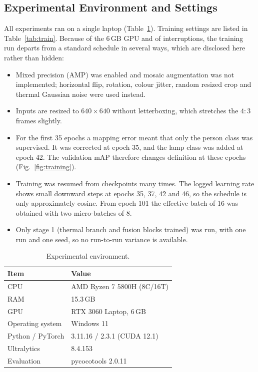 \documentclass[journal]{IEEEtran}
\begin{document}
\subsection{Experimental Environment and Settings}
All experiments ran on a single laptop (Table~\ref{tab:env}). Training settings are listed in Table~\ref{tab:train}. Because of the 6\,GB GPU and of interruptions, the training run departs from a standard schedule in several ways, which are disclosed here rather than hidden:
\begin{itemize}
\item Mixed precision (AMP) was enabled and mosaic augmentation was not implemented; horizontal flip, rotation, colour jitter, random resized crop and thermal Gaussian noise were used instead.
\item Inputs are resized to $640\times640$ without letterboxing, which stretches the $4{:}3$ frames slightly.
\item For the first 35 epochs a mapping error meant that only the person class was supervised. It was corrected at epoch 35, and the lamp class was added at epoch 42. The validation mAP therefore changes definition at these epochs (Fig.~\ref{fig:training}).
\item Training was resumed from checkpoints many times. The logged learning rate shows small downward steps at epochs 35, 37, 42 and 46, so the schedule is only approximately cosine. From epoch 101 the effective batch of 16 was obtained with two micro-batches of 8.
\item Only stage 1 (thermal branch and fusion blocks trained) was run, with one run and one seed, so no run-to-run variance is available.
\end{itemize}

\begin{table}[!t]
\centering
\caption{Experimental environment.}
\label{tab:env}
\footnotesize
\begin{tabular}{@{}ll@{}}
\toprule
Item & Value \\
\midrule
CPU & AMD Ryzen 7 5800H (8C/16T) \\
RAM & 15.3\,GB \\
GPU & RTX 3060 Laptop, 6\,GB \\
Operating system & Windows 11 \\
Python / PyTorch \cite{pytorch} & 3.11.16 / 2.3.1 (CUDA 12.1) \\
Ultralytics \cite{yolov8} & 8.4.153 \\
Evaluation & pycocotools 2.0.11 \\
\bottomrule
\end{tabular}
\end{table}
\end{document}
